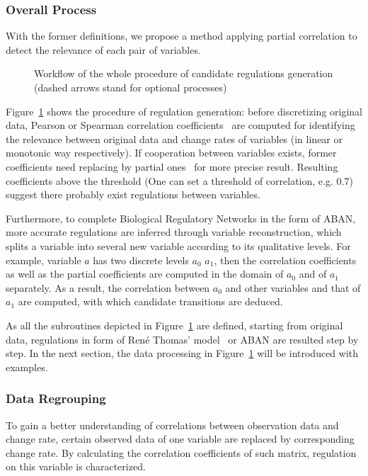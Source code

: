 \subsubsection{Overall Process}

With the former definitions, we propose a method applying partial correlation to detect the relevance of each pair of variables.

\begin{figure}[ht]

\caption[Workflow of model inference \textit{via} partial correlation]{Workflow of the whole procedure of candidate regulations generation (dashed arrows stand for optional processes)}\label{plan}
\end{figure}

Figure~\ref{plan} shows the procedure of regulation generation: before discretizing original data, Pearson or Spearman correlation coefficients~\cite{samaga2009logic,hauke2011comparison} are computed for identifying the relevance between original data and change rates of variables (in linear or monotonic way respectively). If cooperation between variables exists, former coefficients need replacing by partial ones~\cite{de2004discovery} for more precise result.
Resulting coefficients above the threshold (One can set a threshold of correlation, e.g. 0.7) suggest there probably exist regulations between variables.

Furthermore, to complete Biological Regulatory Networks in the form of ABAN, more accurate regulations are inferred through variable reconstruction, which splits a variable into several new variable according to its qualitative levels.
For example, variable $a$ has two discrete levels $a_0$ $a_1$, then the correlation coefficients as well as the partial coefficients are computed in the domain of $a_0$ and of $a_1$ separately.
As a result, the correlation between $a_0$ and other variables and that of $a_1$ are computed, with which candidate transitions are deduced.

As all the subroutines depicted in Figure~\ref{plan} are defined, starting from original data, regulations in form of Ren\'e Thomas' model~\cite{thomas1978} or ABAN are resulted step by step. In the next section, the data processing in Figure~\ref{plan} will be introduced with examples.

\subsubsection*{Data Regrouping}
To gain a better understanding of correlations between observation data and change rate, certain observed data of one variable are replaced by corresponding change rate. By calculating the correlation coefficients of such matrix, regulation on this variable is characterized.

